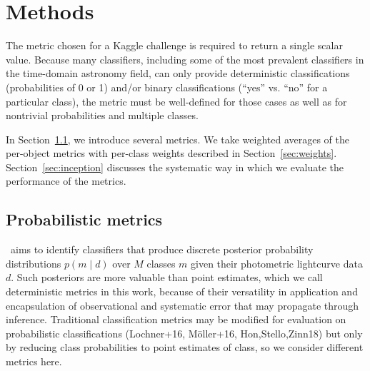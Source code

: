 \section{Methods}
\label{sec:methods}


The metric chosen for a Kaggle challenge is required to return a single scalar value.
Because many classifiers, including some of the most prevalent classifiers in the time-domain astronomy field, can only provide deterministic classifications (probabilities of 0 or 1) and/or binary classifications (``yes'' vs. ``no'' for a particular class), the metric must be well-defined for those cases as well as for nontrivial probabilities and multiple classes.

In Section~\ref{sec:metrics}, we introduce several metrics.
We take weighted averages of the per-object metrics with per-class weights described in Section~\ref{sec:weights}.
Section~\ref{sec:inception} discusses the systematic way in which we evaluate the performance of the metrics.

\subsection{Probabilistic metrics}
\label{sec:metrics}

\plasticc\ aims to identify classifiers that produce discrete posterior probability distributions $p(m \mid d)$ over $M$ classes $m$ given their photometric lightcurve data $d$.
Such posteriors are more valuable than point estimates, which we call deterministic metrics in this work, because of their versatility in application and encapsulation of observational and systematic error that may propagate through inference.
Traditional classification metrics may be modified for evaluation on probabilistic classifications (Lochner+16, M\"{o}ller+16, Hon,Stello,Zinn18) but only by reducing class probabilities to point estimates of class, so we consider different metrics here.

